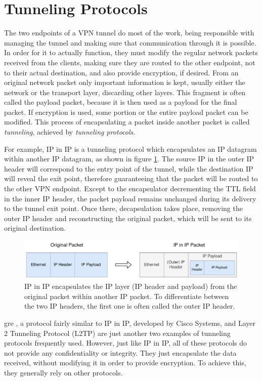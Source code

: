 \documentclass[a4paper,12pt]{report}
\begin{document}
		\section{Tunneling Protocols}
		The two endpoints of a VPN tunnel do most of the work, being responsible with managing the tunnel and making sure that communication through it is possible. In order for it to actually function, they must modify the regular network packets received from the clients, making sure they are routed to the other endpoint, not to their actual destination, and also provide encryption, if desired. From an original network packet only important information is kept, usually either the network or the transport layer, discarding other layers. This fragment is often called the payload packet, because it is then used as a payload for the final packet. If encryption is used, some portion or the entire payload packet can be modified. This process of encapsulating a packet inside another packet is called \textit{tunneling}, achieved by \textit{tunneling protocols}.
		
		For example, IP in IP \cite{rfc2003} is a tunneling protocol which encapsulates an IP datagram within another IP datagram, as shown in figure \ref{fig:ip-in-ip_packet}. The source IP in the outer IP header will correspond to the entry point of the tunnel, while the destination IP will reveal the exit point, therefore guaranteeing that the packet will be routed to the other VPN endpoint. Except to the encapsulator decrementing the TTL field in the inner IP header, the packet payload remains unchanged during its delivery to the tunnel exit point. Once there, decapsulation takes place, removing the outer IP header and reconstructing the original packet, which will be sent to its original destination.
		\begin{figure}[h]
			\includegraphics[width=\textwidth]{ip-in-ip_packet}
			\centering
			\caption{IP in IP encapsulates the IP layer (IP header and payload) from the original packet within another IP packet. To differentiate between the two IP headers, the first one is often called the outer IP header.}
			\label{fig:ip-in-ip_packet}
		\end{figure}
		
		\acrfull{gre} \cite{rfc2784}, a protocol fairly similar to IP in IP, developed by Cisco Systems, and Layer 2 Tunneling Protocol (L2TP) \cite{rfc2661} are just another two examples of tunneling protocols frequently used. However, just like IP in IP, all of these protocols do not provide any confidentiality or integrity. They just encapsulate the data received, without modifying it in order to provide encryption. To achieve this, they generally rely on other protocols.
		
\end{document}
